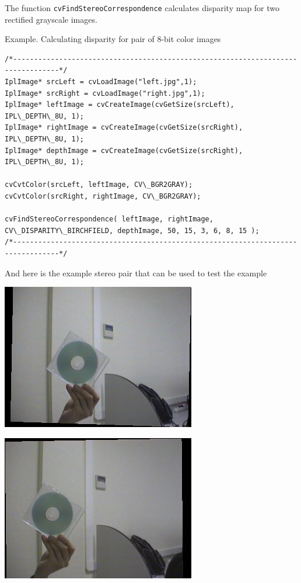 The function \texttt{cvFindStereoCorrespondence} calculates disparity map for two rectified grayscale images.

Example. Calculating disparity for pair of 8-bit color images

\begin{lstlisting}
/*---------------------------------------------------------------------------------*/
IplImage* srcLeft = cvLoadImage("left.jpg",1);
IplImage* srcRight = cvLoadImage("right.jpg",1);
IplImage* leftImage = cvCreateImage(cvGetSize(srcLeft), IPL\_DEPTH\_8U, 1);
IplImage* rightImage = cvCreateImage(cvGetSize(srcRight), IPL\_DEPTH\_8U, 1);
IplImage* depthImage = cvCreateImage(cvGetSize(srcRight), IPL\_DEPTH\_8U, 1);

cvCvtColor(srcLeft, leftImage, CV\_BGR2GRAY);
cvCvtColor(srcRight, rightImage, CV\_BGR2GRAY);

cvFindStereoCorrespondence( leftImage, rightImage, CV\_DISPARITY\_BIRCHFIELD, depthImage, 50, 15, 3, 6, 8, 15 );
/*---------------------------------------------------------------------------------*/

\end{lstlisting}

And here is the example stereo pair that can be used to test the example

\includegraphics{pics/left.jpg}

\includegraphics{pics/right.jpg}


